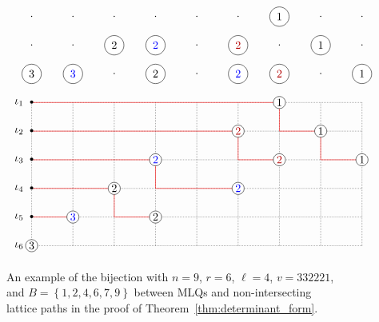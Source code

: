 \documentclass[reqno]{amsart}
\newcommand{\0}{\phantom{c}}
\newcommand{\set}[1]{\left\{ #1 \right\}}
\theoremstyle{plain}
\theoremstyle{definition}
\numberwithin{equation}{section}
\begin{document}
\begin{figure}[t]
\[
\begin{tikzpicture}[xscale=1.3,yscale=0.9]
  \begin{scope}[yshift=7cm]
    \foreach \i in {1,...,9}{
      \foreach \j in {0,1,2}{
        \node at (\i,\j){$\cdot$};
      }
    }
    \node[circle,fill=white,draw=black] at  (1, 0){$3$};
    \node[circle,fill=white,draw=black,text=blue] at  (2, 0){$3$};
    \node[circle,fill=white,draw=black] at  (4, 0){$2$};
    \node[circle,fill=white,draw=black,text=blue] at  (6, 0){$2$};
    \node[circle,fill=white,draw=black,text=darkred] at  (7, 0){$2$};
    \node[circle,fill=white,draw=black] at  (9, 0){$1$};
    \node[circle,fill=white,draw=black] at  (3, 1){$2$};
    \node[circle,fill=white,draw=black,text=blue] at  (4, 1){$2$};
    \node[circle,fill=white,draw=black,text=darkred] at  (6, 1){$2$};
    \node[circle,fill=white,draw=black] at  (8, 1){$1$};
    \node[circle,fill=white,draw=black] at  (7, 2){$1$};
  \end{scope}

  \draw[densely dotted] (1,1) grid (9,6);

  \draw[draw=red] (1,2)--(2,2);
  \draw[draw=red] (1,3)--(3,3)--(3,2)--(4,2);
  \draw[draw=red] (1,4)--(4,4)--(4,3)--(6,3);
  \draw[draw=red] (1,5)--(6,5)--(6,4)--(7,4);
  \draw[draw=red] (1,6)--(7,6)--(7,5)--(8,5)--(8,4)--(9,4);
  
  \node[circle,fill=white,draw=black,inner sep=1pt] at (1,1) {$3$};
  \node[circle,fill=white,draw=black,text=blue,inner sep=1pt] at (2,2) {$3$};
  \node[circle,fill=white,draw=black,inner sep=1pt] at (4,2) {$2$};
  \node[circle,fill=white,draw=black,inner sep=1pt] at (3,3) {$2$};
  \node[circle,fill=white,draw=black,text=blue,inner sep=1pt] at (4,4) {$2$};
  \node[circle,fill=white,draw=black,text=blue,inner sep=1pt] at (6,3) {$2$};
  \node[circle,fill=white,draw=black,text=darkred,inner sep=1pt] at (6,5) {$2$};
  \node[circle,fill=white,draw=black,text=darkred,inner sep=1pt] at (7,4) {$2$};
  \node[circle,fill=white,draw=black,inner sep=1pt] at (7,6) {$1$};
  \node[circle,fill=white,draw=black,inner sep=1pt] at (8,5) {$1$};
  \node[circle,fill=white,draw=black,inner sep=1pt] at (9,4) {$1$};

  \foreach \i in {2,...,6} {
    \node at (1,\i) {\textbullet};
  }
  \foreach \i in {1,...,6} {
    \node[anchor=east,inner sep=7pt] at (1,7-\i) {$\iota_{\i}$};
  }
\end{tikzpicture}
\]
\caption{An example of the bijection with $n = 9$, $r = 6$, $\ell = 4$, $v = 332221$, and $B = \set{1,2,4,6,7,9}$ between MLQs and non-intersecting lattice paths in the proof of Theorem~\ref{thm:determinant_form}.}
\label{fig:lattice_path_bijection}
\end{figure}
\end{document}
